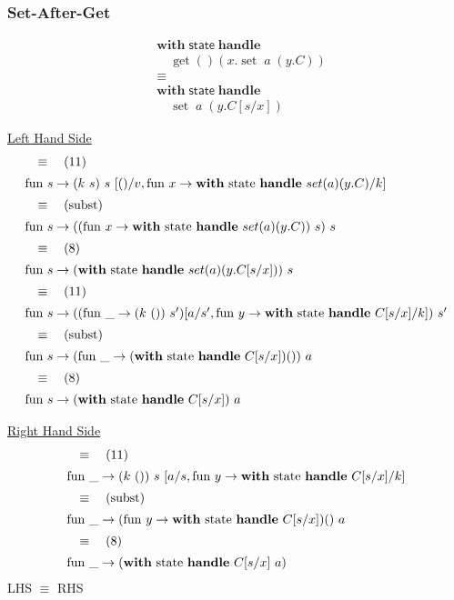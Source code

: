 \documentclass[logo,bsc,singlespacing,parskip]{infthesis}
\begin{document}
\subsubsection*{Set-After-Get}

\[
\begin{aligned}
    &\mathsf{\textbf{with}} \; \mathsf{state} \; \mathsf{\textbf{handle}} \\
    &\quad \operatorname{get}() \left( x. \operatorname{set} \; a \; (y. C) \right) \\
    &\equiv \\
    &\mathsf{\textbf{with}} \; \mathsf{state} \; \mathsf{\textbf{handle}} \\
    &\quad \operatorname{set} \; a \; (y. C[s/x])
\end{aligned}
\]

\underline{Left Hand Side}
\[ 
\begin{array}{l}
\quad\equiv\quad (11) \\[5pt]
\text{fun } s \rightarrow (k\ s)\ s\ [()/v, \text{fun } x \rightarrow \text{\textbf{with} state \textbf{handle} } set(a)(y.C)/k] \\[5pt]
\quad\equiv\quad (\text{subst}) \\[5pt]
\text{fun } s \rightarrow ((\text{fun } x \rightarrow \text{\textbf{with} state \textbf{handle} } set(a)(y.C))\ s)\ s \\[5pt]
\quad\equiv\quad (8) \\[5pt]
\text{fun } s \rightarrow (\text{\textbf{with} state \textbf{handle} } set(a)(y.C[s/x]))\ s \\[5pt]
\quad\equiv\quad (11) \\[5pt]
\text{fun } s \rightarrow ((\text{fun } \_ \rightarrow (k\ ())\ s')[a/s', \text{fun } y \rightarrow \text{\textbf{with} state \textbf{handle} } C[s/x]/k])\ s' \\[5pt]
\quad\equiv\quad (\text{subst}) \\[5pt]
\text{fun } s \rightarrow (\text{fun } \_ \rightarrow (\text{\textbf{with} state \textbf{handle} } C[s/x]) ())\ a \\[5pt]
\quad\equiv\quad (8) \\[5pt]
\text{fun } s \rightarrow (\text{\textbf{with} state \textbf{handle} } C[s/x])\ a
\end{array}
\]


\underline{Right Hand Side}
\[ 
\begin{array}{l}
\quad\equiv\quad (11) \\[5pt]
\text{fun }\_ \rightarrow (k\ ())\ s\ [a/s, \text{fun } y \rightarrow \text{\textbf{with} state \textbf{handle} } C[s/x]/k] \\[5pt]
\quad\equiv\quad (\text{subst}) \\[5pt]
\text{fun }\_ \rightarrow (\text{fun } y \rightarrow \text{\textbf{with} state \textbf{handle} } C[s/x]) ()\ a \\[5pt]
\quad\equiv\quad (8) \\[5pt]
\text{fun }\_ \rightarrow (\text{\textbf{with} state \textbf{handle} } C[s/x]\ a)
\end{array}
\]
LHS $\equiv$ RHS
\end{document}
